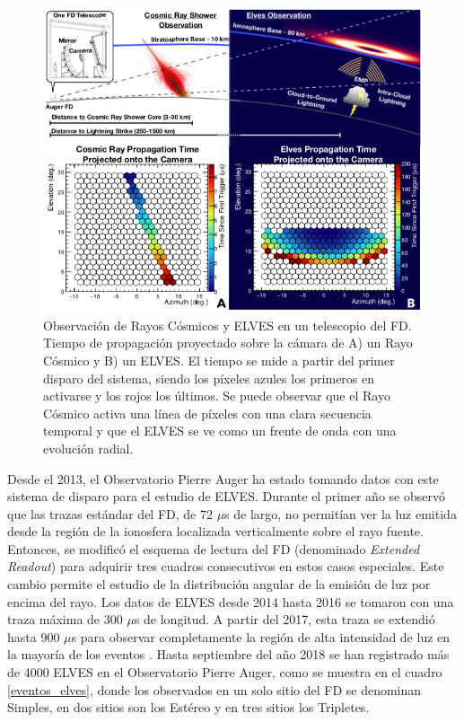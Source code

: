 \documentclass[11pt,oneside,openany,letter]{book}
\begin{document}
\begin{figure} 

    \centering
    \includegraphics[scale=0.6]{figures/cr_vs_elves.png}
    \caption[Observaci\'on de Rayos C\'osmicos y ELVES en un telescopio del FD del Observatorio Pierre Auger]{Observaci\'on de Rayos C\'osmicos y ELVES en un telescopio del FD. Tiempo de propagaci\'on proyectado sobre la c\'amara
    de A) un Rayo C\'osmico y B) un ELVES. El tiempo se mide a partir del primer disparo del sistema, siendo los p\'ixeles azules los primeros en activarse y los rojos los \'ultimos. Se puede observar que el Rayo C\'osmico activa una l\'inea de p\'ixeles con una clara secuencia temporal y que el ELVES se ve como un frente de onda con una evolución radial.}
    \label{fig:crs_elves}
\end{figure}

Desde el 2013, el Observatorio Pierre Auger ha estado tomando datos con este sistema de disparo para el estudio de ELVES. Durante el primer año se observ\'o que las trazas estándar del FD, de 72 $\mu$s de largo, no permit\'ian ver la luz emitida desde la regi\'on de la ionosfera localizada verticalmente sobre el rayo fuente. Entonces, se modific\'o el esquema de lectura del FD (denominado \textit{Extended Readout}) para adquirir tres cuadros consecutivos en estos casos especiales. Este cambio permite el estudio de la distribuci\'on angular de la emisi\'on de luz por encima del rayo. Los datos de ELVES desde 2014 hasta 2016 se tomaron con una traza m\'axima de 300 $\mu$s de longitud. A partir del 2017, esta traza se extendi\'o hasta 900 $\mu$s para observar completamente la regi\'on de alta intensidad de luz en la mayor\'ia de los eventos \cite{Mussa2019}. Hasta septiembre del año 2018 se han registrado m\'as de 4000 ELVES en el Observatorio Pierre Auger, como se muestra en el cuadro \ref{eventos_elves}, donde los observados en un solo sitio del FD se denominan Simples, en dos sitios son los Estéreo y en tres sitios los Tripletes.  
\end{document}
